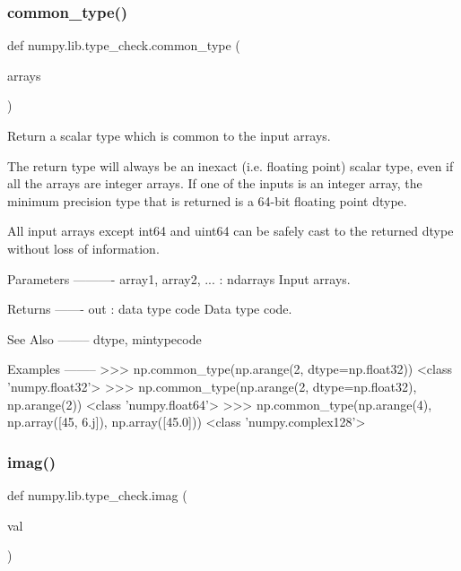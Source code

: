 \subsubsection{\texorpdfstring{common\+\_\+type()}{common\_type()}}
{\footnotesize\ttfamily def numpy.\+lib.\+type\+\_\+check.\+common\+\_\+type (\begin{DoxyParamCaption}\item[{}]{arrays }\end{DoxyParamCaption})}

\begin{DoxyVerb}Return a scalar type which is common to the input arrays.

The return type will always be an inexact (i.e. floating point) scalar
type, even if all the arrays are integer arrays. If one of the inputs is
an integer array, the minimum precision type that is returned is a
64-bit floating point dtype.

All input arrays except int64 and uint64 can be safely cast to the
returned dtype without loss of information.

Parameters
----------
array1, array2, ... : ndarrays
    Input arrays.

Returns
-------
out : data type code
    Data type code.

See Also
--------
dtype, mintypecode

Examples
--------
>>> np.common_type(np.arange(2, dtype=np.float32))
<class 'numpy.float32'>
>>> np.common_type(np.arange(2, dtype=np.float32), np.arange(2))
<class 'numpy.float64'>
>>> np.common_type(np.arange(4), np.array([45, 6.j]), np.array([45.0]))
<class 'numpy.complex128'>\end{DoxyVerb}
 \mbox{\label{namespacenumpy_1_1lib_1_1type__check_a5c7944d6dcfdeeffd527e27aa947fcd5}} 
\subsubsection{\texorpdfstring{imag()}{imag()}}
{\footnotesize\ttfamily def numpy.\+lib.\+type\+\_\+check.\+imag (\begin{DoxyParamCaption}\item[{}]{val }\end{DoxyParamCaption})}

